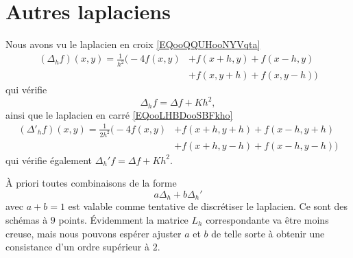 \section{Autres laplaciens}

Nous avons vu le laplacien en croix \eqref{EQooQQUHooNYVqta}
\begin{subequations}\label{EQooOBWUooDEWKYv}
	\begin{align}
		(\Delta_hf)(x,y)=\frac{1}{ h^2 }\big( -4f(x,y) & +f(x+h,y)+f(x-h,y)       \\
		                                               & +f(x,y+h)+f(x,y-h) \big)
	\end{align}
\end{subequations}
qui vérifie
\begin{equation}        \label{EQooQITHooZVJlVa}
	\Delta_hf=\Delta f+Kh^2,
\end{equation}
ainsi que le laplacien en carré \eqref{EQooLHBDooSBFkho}
\begin{subequations}   \label{EQooUOYVooRpAMOC}
	\begin{align}
		(\Delta'_hf)(x,y)=\frac{1}{ 2h^2 }\Big( -4f(x,y) & +f(x+h,y+h)+f(x-h,y+h)       \\
		                                                 & +f(x+h,y-h)+f(x-h,y-h) \Big)
	\end{align}
\end{subequations}
qui vérifie également \( \Delta_h'f=\Delta f+Kh^2\).

À priori toutes combinaisons de la forme
\begin{equation}
	a\Delta_h+b\Delta_h'
\end{equation}
avec \( a+b=1\) est valable comme tentative de discrétiser le laplacien. Ce sont des schémas à \( 9\) points. Évidemment la matrice \( L_h\) correspondante va être moins creuse, mais nous pouvons espérer ajuster \( a\) et \( b\) de telle sorte à obtenir une consistance d'un ordre supérieur à \( 2\).

